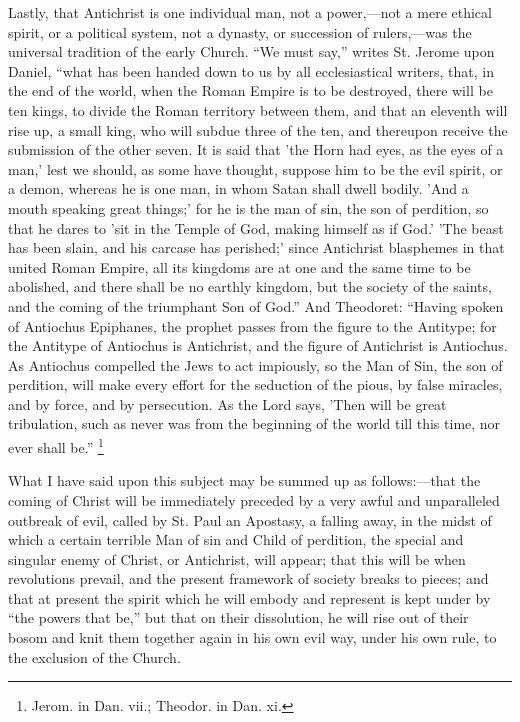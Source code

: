 Lastly, that Antichrist is one individual man, not a power,—not a
mere ethical spirit, or a political system, not a dynasty, or
succession of rulers,—was the universal tradition of the early
Church. ``We must say,'' writes St. Jerome upon Daniel,
``what has been handed down to us by all ecclesiastical writers,
that, in the end of the world, when the Roman Empire is to be
destroyed, there will be ten kings, to divide the Roman territory
between them, and that an eleventh will rise up, a small king, who
will subdue three of the ten, and thereupon receive the submission of
the other seven. It is said that 'the Horn had eyes, as the eyes of a
man,' lest we should, as some have thought, suppose him to be the evil
spirit, or a demon, whereas he is one man, in whom Satan shall dwell
bodily. 'And a mouth speaking great things;' for he is the man of sin,
the son of perdition, so that he dares to 'sit in the Temple of God,
making himself as if God.' 'The beast has been slain, and his carcase
has perished;' since Antichrist blasphemes in that united Roman
Empire, all its kingdoms are at one and the same time to be abolished,
and there shall be no earthly kingdom, but the society of the saints,
and the coming of the triumphant Son of God.'' And Theodoret:
``Having spoken of Antiochus Epiphanes, the prophet passes from
the figure to the Antitype; for the Antitype of Antiochus is
Antichrist, and the figure of Antichrist is Antiochus. As Antiochus
compelled the Jews to act impiously, so the Man of Sin, the son of
perdition, will make every effort for the seduction of the pious, by
false miracles, and by force, and by persecution. As the Lord says,
'Then will be great tribulation, such as never was from the beginning
of the world till this time, nor ever shall be.'' \footnote{Jerom. in Dan. vii.; Theodor. in Dan. xi.}

What I have said upon this subject may be summed up as follows:—that
the coming of Christ will be immediately preceded by a very awful and
unparalleled outbreak of evil, called by St. Paul an Apostasy, a
falling away, in the midst of which a certain terrible Man of sin and
Child of perdition, the special and singular enemy of Christ, or
Antichrist, will appear; that this will be when revolutions prevail,
and the present framework of society breaks to pieces; and that at
present the spirit which he will embody and represent is kept under by
``the powers that be,'' but that on their dissolution, he will
rise out of their bosom and knit them together again in his own evil
way, under his own rule, to the exclusion of the Church.

